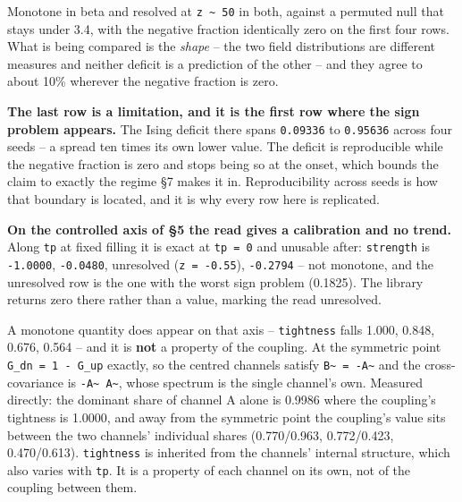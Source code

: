 \documentclass[10pt,letterpaper,twocolumn]{article}
\begin{document}
Monotone in beta and resolved at \texttt{\textbar{}\allowbreak{}z\textbar{}\allowbreak{}\ \textasciitilde{}\ 50} in both, against a permuted null that stays under 3.4,
with the negative fraction identically zero on the first four rows. What is being compared is the
\emph{shape} -- the two field distributions are different measures and neither deficit is a prediction
of the other -- and they agree to about 10\% wherever the negative fraction is zero.

\textbf{The last row is a limitation, and it is the first row where the sign problem appears.} The Ising
deficit there spans \texttt{0.\allowbreak{}09336} to \texttt{0.\allowbreak{}95636} across four seeds -- a spread ten times its own lower
value. The deficit is reproducible while the negative fraction is zero and stops being so at the
onset, which bounds the claim to exactly the regime §7 makes it in. Reproducibility across seeds
is how that boundary is located, and it is why every row here is replicated.

\textbf{On the controlled axis of §5 the read gives a calibration and no trend.} Along \texttt{tp} at fixed
filling it is exact at \texttt{tp\ =\allowbreak{}\ 0} and unusable after: \texttt{strength} is \texttt{-{}\allowbreak{}1.\allowbreak{}0000}, \texttt{-{}\allowbreak{}0.\allowbreak{}0480}, unresolved
(\texttt{z\ =\allowbreak{}\ -{}\allowbreak{}0.\allowbreak{}55}), \texttt{-{}\allowbreak{}0.\allowbreak{}2794} -- not monotone, and the unresolved row is the one with the worst sign
problem (0.1825). The library returns zero there rather than a value, marking the read unresolved.

A monotone quantity does appear on that axis -- \texttt{tightness} falls 1.000, 0.848, 0.676, 0.564 --
and it is \textbf{not} a property of the coupling. At the symmetric point \texttt{G\_\allowbreak{}dn\ =\allowbreak{}\ 1\ -{}\allowbreak{}\ G\_\allowbreak{}up} exactly, so
the centred channels satisfy \texttt{B\textasciitilde{}\ =\allowbreak{}\ -{}\allowbreak{}A\textasciitilde{}} and the cross-covariance is \texttt{-{}\allowbreak{}A\textasciitilde{}\textquotesingle{}\ A\textasciitilde{}}, whose spectrum is
the single channel's own. Measured directly: the dominant share of channel A alone is 0.9986 where
the coupling's tightness is 1.0000, and away from the symmetric point the coupling's value sits
between the two channels' individual shares (0.770/0.963, 0.772/0.423, 0.470/0.613). \texttt{tightness}
is inherited from the channels' internal structure, which also varies with \texttt{tp}. It is a property
of each channel on its own, not of the coupling between them.
\end{document}
